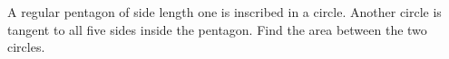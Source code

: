 A regular pentagon of side length one is inscribed in a circle. Another circle is tangent to all five sides inside the pentagon. Find the area between the two circles.
